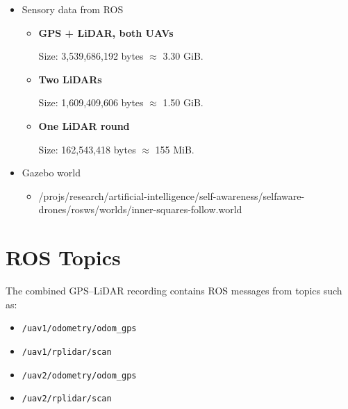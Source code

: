 \documentclass[a4paper]{article}
\begin{document}
      \begin{itemize}
         \item Sensory data from ROS
         \begin{itemize}


            \item \textbf{GPS + LiDAR, both UAVs}

            \texttt{}

            Size: 3,539,686,192 bytes $\approx$ 3.30 GiB.

            \item \textbf{Two LiDARs}

            \texttt{}

            Size: 1,609,409,606 bytes $\approx$ 1.50 GiB.

            \item \textbf{One LiDAR round}

            \texttt{}

            Size: 162,543,418 bytes $\approx$ 155 MiB.
         \end{itemize}
         \item Gazebo world
         \begin{itemize}
            \item /projs/research/artificial-intelligence/self-awareness/selfaware-drones/rosws/worlds/inner-squares-follow.world
         \end{itemize}

      \end{itemize}

   \section{ROS Topics}

      The combined GPS--LiDAR recording contains ROS messages from topics such as:

      \begin{itemize}
         \item \texttt{/uav1/odometry/odom\_gps}
         \item \texttt{/uav1/rplidar/scan}
         \item \texttt{/uav2/odometry/odom\_gps}
         \item \texttt{/uav2/rplidar/scan}
      \end{itemize}
\end{document}
